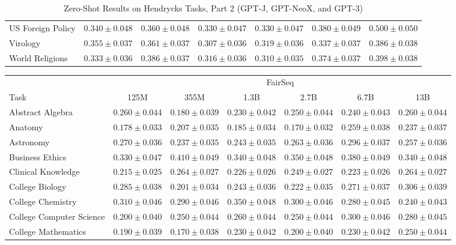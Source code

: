 \documentclass[11pt]{article}
\begin{document}
{\begin{landscape}
\begin{table}
\begin{tabular}{l c c c c c c }
US Foreign Policy & $0.340 \pm 0.048$ & $0.360 \pm 0.048$ & $0.330 \pm 0.047$ & $0.330 \pm 0.047$ & $0.380 \pm 0.049$ & $0.500 \pm 0.050$ \\ 
Virology & $0.355 \pm 0.037$ & $0.361 \pm 0.037$ & $0.307 \pm 0.036$ & $0.319 \pm 0.036$ & $0.337 \pm 0.037$ & $0.386 \pm 0.038$ \\ 
World Religions & $0.333 \pm 0.036$ & $0.386 \pm 0.037$ & $0.316 \pm 0.036$ & $0.310 \pm 0.035$ & $0.374 \pm 0.037$ & $0.398 \pm 0.038$ \\  \bottomrule
\end{tabular}
\caption{Zero-Shot Results on Hendrycks Tasks, Part 2 (GPT-J, GPT-NeoX, and GPT-3)}
\label{tab:hendrycks-gpt2}
\end{table}

\begin{table}    
\centering %
\begin{tabular}{l c c c c c c }
 & \multicolumn{6}{c}{FairSeq} \\
Task & 125M & 355M & 1.3B & 2.7B & 6.7B & 13B\\ \toprule
Abstract Algebra & $0.260 \pm 0.044$ & $0.180 \pm 0.039$ & $0.230 \pm 0.042$ & $0.250 \pm 0.044$ & $0.240 \pm 0.043$ & $0.260 \pm 0.044$ \\ 
Anatomy & $0.178 \pm 0.033$ & $0.207 \pm 0.035$ & $0.185 \pm 0.034$ & $0.170 \pm 0.032$ & $0.259 \pm 0.038$ & $0.237 \pm 0.037$ \\ 
Astronomy & $0.270 \pm 0.036$ & $0.237 \pm 0.035$ & $0.243 \pm 0.035$ & $0.263 \pm 0.036$ & $0.296 \pm 0.037$ & $0.257 \pm 0.036$ \\ 
Business Ethics & $0.330 \pm 0.047$ & $0.410 \pm 0.049$ & $0.340 \pm 0.048$ & $0.350 \pm 0.048$ & $0.380 \pm 0.049$ & $0.340 \pm 0.048$ \\ 
Clinical Knowledge & $0.215 \pm 0.025$ & $0.264 \pm 0.027$ & $0.226 \pm 0.026$ & $0.249 \pm 0.027$ & $0.223 \pm 0.026$ & $0.264 \pm 0.027$ \\ 
College Biology & $0.285 \pm 0.038$ & $0.201 \pm 0.034$ & $0.243 \pm 0.036$ & $0.222 \pm 0.035$ & $0.271 \pm 0.037$ & $0.306 \pm 0.039$ \\ 
College Chemistry & $0.310 \pm 0.046$ & $0.290 \pm 0.046$ & $0.350 \pm 0.048$ & $0.300 \pm 0.046$ & $0.280 \pm 0.045$ & $0.240 \pm 0.043$ \\ 
College Computer Science & $0.200 \pm 0.040$ & $0.250 \pm 0.044$ & $0.260 \pm 0.044$ & $0.250 \pm 0.044$ & $0.300 \pm 0.046$ & $0.280 \pm 0.045$ \\ 
College Mathematics & $0.190 \pm 0.039$ & $0.170 \pm 0.038$ & $0.230 \pm 0.042$ & $0.200 \pm 0.040$ & $0.230 \pm 0.042$ & $0.250 \pm 0.044$ \\ 

\end{tabular}
\end{table}
\end{landscape}}
\end{document}
